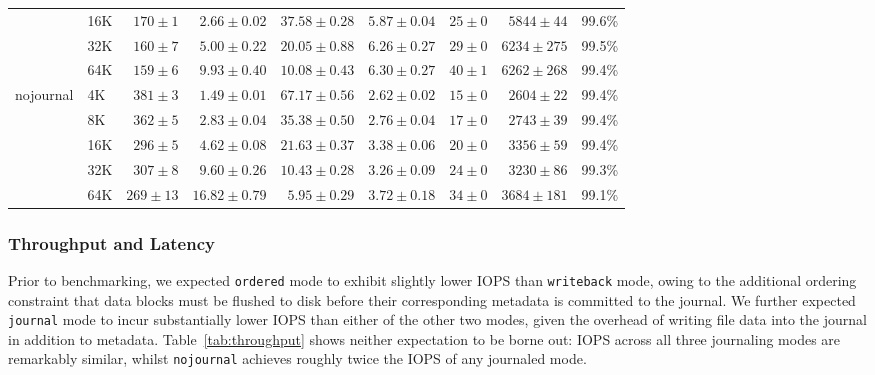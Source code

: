 \documentclass[12pt,a4paper]{article}
\begin{document}
\begin{table}[H]
{\begin{tabular}{llrrrrrrr}
  & 16K & $170 \pm 1$   & $2.66 \pm 0.02$ & $37.58  \pm 0.28$  & $5.87 \pm 0.04$ & $25 \pm 0$ & $5844 \pm 44$  & 99.6\% \\
  & 32K & $160 \pm 7$   & $5.00 \pm 0.22$ & $20.05  \pm 0.88$  & $6.26 \pm 0.27$ & $29 \pm 0$ & $6234 \pm 275$ & 99.5\% \\
  & 64K & $159 \pm 6$   & $9.93 \pm 0.40$ & $10.08  \pm 0.43$  & $6.30 \pm 0.27$ & $40 \pm 1$ & $6262 \pm 268$ & 99.4\% \\
\midrule
\multirow{5}{*}{nojournal}
  & 4K  & $381 \pm 3$   & $1.49 \pm 0.01$ & $67.17  \pm 0.56$  & $2.62 \pm 0.02$ & $15 \pm 0$ & $2604 \pm 22$  & 99.4\% \\
  & 8K  & $362 \pm 5$   & $2.83 \pm 0.04$ & $35.38  \pm 0.50$  & $2.76 \pm 0.04$ & $17 \pm 0$ & $2743 \pm 39$  & 99.4\% \\
  & 16K & $296 \pm 5$   & $4.62 \pm 0.08$ & $21.63  \pm 0.37$  & $3.38 \pm 0.06$ & $20 \pm 0$ & $3356 \pm 59$  & 99.4\% \\
  & 32K & $307 \pm 8$   & $9.60 \pm 0.26$ & $10.43  \pm 0.28$  & $3.26 \pm 0.09$ & $24 \pm 0$ & $3230 \pm 86$  & 99.3\% \\
  & 64K & $269 \pm 13$  & $16.82\pm 0.79$ & $5.95   \pm 0.29$  & $3.72 \pm 0.18$ & $34 \pm 0$ & $3684 \pm 181$ & 99.1\% \\
\bottomrule
\end{tabular}%
}
\end{table}

\subsubsection{Throughput and Latency}
Prior to benchmarking, we expected \texttt{ordered} mode to exhibit slightly lower IOPS
than \texttt{writeback} mode, owing to the additional ordering constraint that data
blocks must be flushed to disk before their corresponding metadata is committed to the
journal. We further expected \texttt{journal} mode to incur substantially lower IOPS
than either of the other two modes, given the overhead of writing file data into the
journal in addition to metadata. Table~\ref{tab:throughput} shows neither expectation
to be borne out: IOPS across all three journaling modes are remarkably similar, whilst
\texttt{nojournal} achieves roughly twice the IOPS of any journaled mode.
\end{document}
